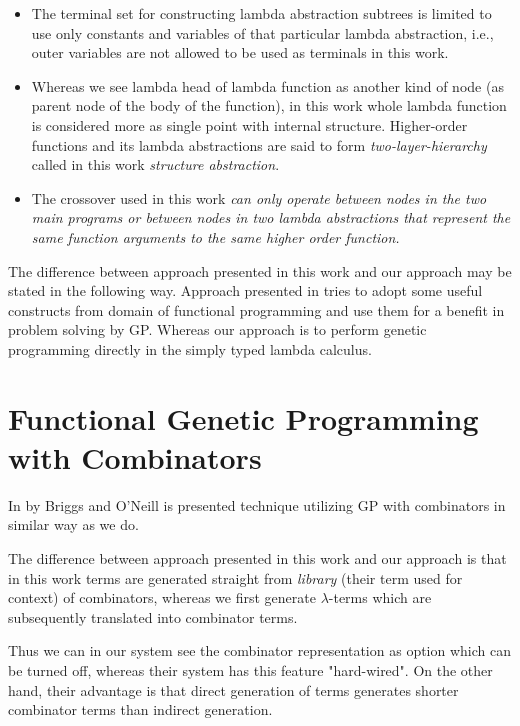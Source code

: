 \documentclass[12pt,a4paper]{report}
\begin{document}
\begin{itemize}
\item The terminal set for constructing lambda abstraction subtrees 
      is limited to use only constants and variables of that particular
      lambda abstraction, i.e., outer variables are not allowed to be used
      as terminals in this work.
\item  Whereas we see lambda head of lambda function as 
another kind of node (as parent node of the body of the function), 
in this work whole lambda function is considered more as single
point with internal structure. Higher-order functions
and its lambda abstractions are said to form \textit{two-layer-hierarchy}
called in this work \textit{structure abstraction}.
\item The crossover used in this work \textit{can only operate 
between nodes in the two main programs or 
between nodes in two lambda abstractions that represent 
the same function arguments to the same higher order function. }
\end{itemize}

The difference between approach presented in this work and our approach 
may be stated in the following way. Approach presented in \cite{yo01}
tries to adopt some useful constructs from domain
of functional programming and use them for a benefit in problem solving by GP.
Whereas our approach is to perform genetic programming directly in the
simply typed lambda calculus.
  



\section{Functional Genetic Programming with Combinators}
In \cite{kes} by Briggs and O’Neill is presented technique 
utilizing GP with combinators in similar way as we do.

The difference between approach presented in this work
and our approach is that in this work terms are generated
straight from \textit{library} (their term used for context) 
of combinators, whereas we first generate $\lambda$-terms which are
subsequently translated into combinator terms.

Thus we can in our system see the combinator representation
as option which can be turned off, whereas their system has this
feature "hard-wired". On the other hand, their advantage is
that direct generation of terms generates 
shorter combinator terms than indirect generation.   
\end{document}
